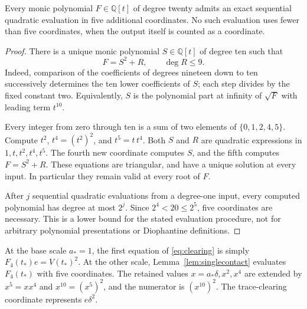 \documentclass[11pt,a4paper]{article}
\newcommand{\Q}{\mathbb Q}\newcommand{\Z}{\mathbb Z}\newcommand{\HH}{\mathcal H}
\begin{document}
\begin{lemma}\label{lem:singlecontact}
Every monic polynomial $F\in\Q[t]$ of degree twenty admits an
exact sequential quadratic evaluation in five additional coordinates.
No such evaluation uses fewer than five coordinates, when the output
itself is counted as a coordinate.
\end{lemma}
\begin{proof}
There is a unique monic polynomial $S\in\Q[t]$ of degree ten such
that
\[
                    F=S^2+R,\qquad \deg R\le9.
\]
Indeed, comparison of the coefficients of degrees nineteen down to
ten successively determines the ten lower coefficients of $S$;
each step divides by the fixed constant two. Equivalently, $S$ is
the polynomial part at infinity of $\sqrt{F}$ with leading term $t^{10}$.

Every integer from zero through ten is a sum of two elements of
$\{0,1,2,4,5\}$. Compute $t^2$, $t^4=(t^2)^2$, and $t^5=t\,t^4$.
Both $S$ and $R$ are quadratic expressions in $1,t,t^2,t^4,t^5$.
The fourth new coordinate computes $S$, and the fifth computes
$F=S^2+R$. These equations are triangular, and have a unique solution
at every input. In particular they remain valid at every root of $F$.

After $j$ sequential quadratic evaluations from a degree-one input,
every computed polynomial has degree at most $2^j$. Since
$2^4<20\le2^5$, five coordinates are necessary. This is a lower bound
for the stated evaluation procedure, not for arbitrary polynomial
presentations or Diophantine definitions.
\end{proof}

At the base scale $a_*=1$, the first equation of
\eqref{eq:clearing} is simply $F_4(t_*)e=V(t_*)^2$.
At the other scale, Lemma~\ref{lem:singlecontact} evaluates $F_4(t_*)$
with five coordinates. The retained values $x=a_*\delta,x^2,x^4$
are extended by $x^5=xx^4$ and $x^{10}=(x^5)^2$, and the numerator
is $(x^{10})^2$. The trace-clearing coordinate represents $e\delta^2$.
\end{document}
